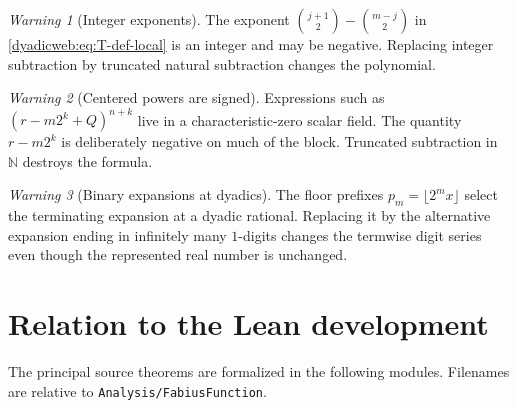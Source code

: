 \documentclass[11pt,oneside]{article}
\theoremstyle{definition}
\theoremstyle{remark}
\newtheorem{warning}[warning]{Warning}
\newcommand{\N}{\mathbb N}
\newcommand{\repo}{\nolinkurl{Analysis/FabiusFunction}}
\begin{document}
\begin{warning}[Integer exponents]
The exponent
$\binom{j+1}{2}-\binom{m-j}{2}$ in \eqref{dyadicweb:eq:T-def-local} is an integer and may be negative.
Replacing integer subtraction by truncated natural subtraction changes the polynomial.
\end{warning}

\begin{warning}[Centered powers are signed]
Expressions such as $(r-m2^k+Q)^{n+k}$ live in a characteristic-zero scalar field.  The
quantity $r-m2^k$ is deliberately negative on much of the block.  Truncated subtraction in
$\N$ destroys the formula.
\end{warning}

\begin{warning}[Binary expansions at dyadics]
The floor prefixes $p_m=\lfloor2^mx\rfloor$ select the terminating expansion at a dyadic
rational.  Replacing it by the alternative expansion ending in infinitely many $1$-digits
changes the termwise digit series even though the represented real number is unchanged.
\end{warning}

\section{Relation to the Lean development}
\label{dyadicweb:sec:formal-map}

The principal source theorems are formalized in the following modules.  Filenames are relative
to \repo.
\end{document}
